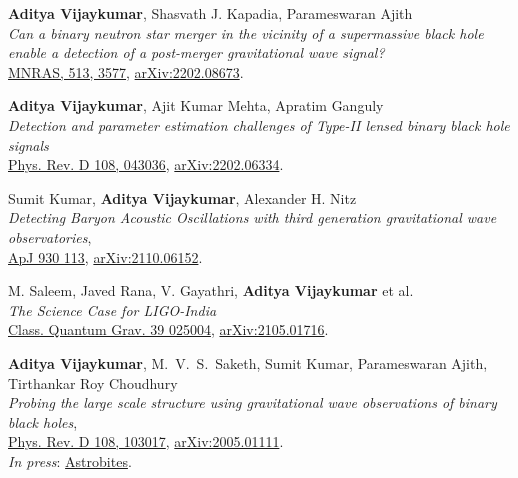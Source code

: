 \begin{etaremune}
 	\item  \textbf{Aditya Vijaykumar}, Shasvath J. Kapadia, Parameswaran Ajith\\
	\textit{Can a binary neutron star merger in the vicinity of a supermassive black hole enable a detection of a post-merger gravitational wave signal?}\\
	\href{https://academic.oup.com/mnras/article/513/3/3577/6573885}{MNRAS, 513, 3577}, \href{https://arxiv.org/abs/2202.08673}{arXiv:2202.08673}.
	
	\item \textbf{Aditya Vijaykumar}, Ajit Kumar Mehta, Apratim Ganguly\\
	\textit{Detection and parameter estimation challenges of Type-II lensed binary black hole signals}\\
	\href{https://journals.aps.org/prd/abstract/10.1103/PhysRevD.108.043036}{Phys. Rev. D 108, 043036}, \href{https://arxiv.org/abs/2202.06334}{arXiv:2202.06334}.

	\item 
	Sumit Kumar, \textbf{Aditya Vijaykumar}, Alexander H. Nitz\\
	\textit{Detecting Baryon Acoustic Oscillations with third generation gravitational wave observatories},\\
	\href{https://iopscience.iop.org/article/10.3847/1538-4357/ac5e34}{ApJ 930 113}, \href{https://arxiv.org/abs/2110.06152}{arXiv:2110.06152}.

	\item M. Saleem, Javed Rana, V. Gayathri, \primary \textbf{Aditya Vijaykumar} et al.\\
	\textit{The Science Case for LIGO-India}\\
	\href{https://iopscience.iop.org/article/10.1088/1361-6382/ac3b99}{Class. Quantum Grav. 39 025004}, \href{https://arxiv.org/abs/2105.01716}{arXiv:2105.01716}.
	
	\item 
	\textbf{Aditya Vijaykumar}, M.~V.~S.~Saketh, Sumit Kumar, Parameswaran Ajith, Tirthankar Roy Choudhury\\
	\textit{Probing the large scale structure using gravitational wave observations of binary black holes},\\
	\href{https://journals.aps.org/prd/abstract/10.1103/PhysRevD.108.103017}{Phys. Rev. D 108, 103017}, \href{https://arxiv.org/abs/2005.01111}{arXiv:2005.01111}.\\
	\textit{In press}: \href{https://astrobites.org/2020/05/07/binary-black-holes-tangled-up-in-the-cosmic-web/}{Astrobites}.
	

\end{etaremune}
